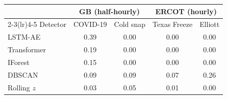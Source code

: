 \begin{tabular}{lcccc}
\toprule
 & \multicolumn{2}{c}{GB (half-hourly)} & \multicolumn{2}{c}{ERCOT (hourly)} \\
\cmidrule(lr){2-3}\cmidrule(lr){4-5}
Detector & COVID-19 & Cold snap & Texas Freeze & Elliott \\
\midrule
LSTM-AE & 0.39 & 0.00 & 0.00 & 0.00 \\
Transformer & 0.19 & 0.00 & 0.00 & 0.00 \\
IForest & 0.15 & 0.00 & 0.00 & 0.00 \\
DBSCAN & 0.09 & 0.09 & 0.07 & 0.26 \\
Rolling $z$ & 0.03 & 0.05 & 0.01 & 0.00 \\
\bottomrule
\end{tabular}
